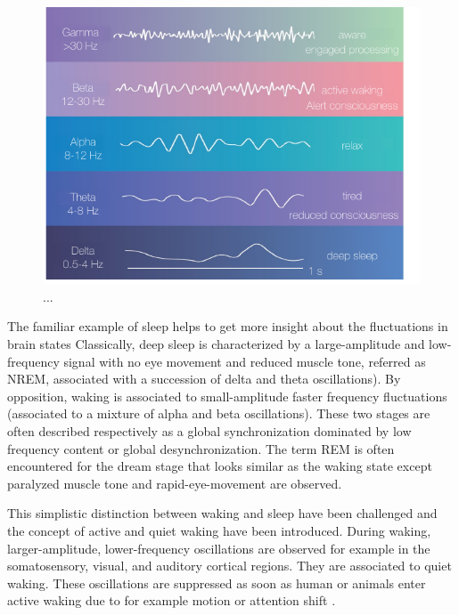 \begin{figure}
\includegraphics[scale=0.75]{latex/fig/Intro/Bdg_BrainWaves.pdf}
\caption{...}
\label{fig:BrainWaves}
\end{figure}

The familiar example of sleep helps to get more insight about the fluctuations in brain states \citep{mcginley_waking_2015, molnar_cell_2021} Classically, deep sleep is characterized by a large-amplitude and low-frequency signal with no eye movement and reduced muscle tone, referred as \acrfull{NREM}, associated with a succession of delta and theta oscillations). By opposition, waking is associated to small-amplitude faster frequency fluctuations (associated to a mixture of alpha and beta oscillations). These two stages are often described respectively as a global synchronization dominated by low frequency content or global desynchronization.  The term \acrfull{REM} is often encountered for the dream stage that looks similar as the waking state except paralyzed muscle tone and rapid-eye-movement are observed. 

This simplistic distinction between waking and sleep have been challenged and the concept of active and quiet waking have been introduced. During waking, larger-amplitude, lower-frequency oscillations are observed for example in the somatosensory, visual, and auditory cortical regions. They are associated to quiet waking. These oscillations are suppressed as soon as human or animals enter active waking due to for example motion or attention shift \citep{mcginley_waking_2015}. 


